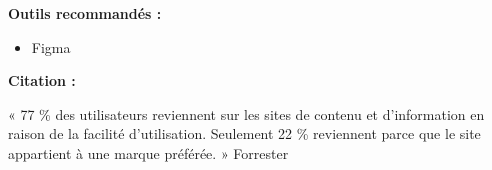 \textbf{Outils recommandés :}

\begin{itemize}
\item Figma
\end{itemize}

\textbf{Citation :}

« 77 \% des utilisateurs reviennent sur les sites de contenu et d'information en raison de la facilité d'utilisation. Seulement 22 \% reviennent parce que le site appartient à une marque préférée. » Forrester

